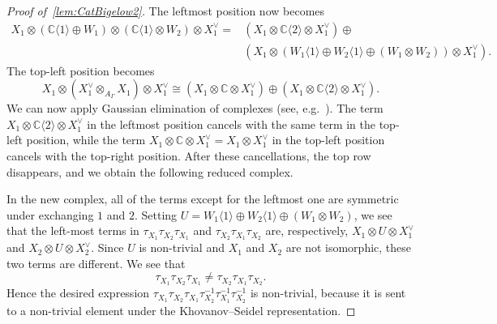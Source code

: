 \documentclass[a4paper]{amsart}
\newcommand{\C}{\mathbb{C}}
\newcommand{\0}{\mathbf{0}}
\theoremstyle{theorem}
\begin{document}
\begin{proof}[Proof of~\cref{lem:CatBigelow2}]
  The leftmost position now becomes
  \begin{align*}
    X_1 \otimes (\mathbb{C}\langle1 \rangle \oplus W_1) \otimes (\mathbb{C}\langle 1 \rangle \otimes W_2) \otimes X_1^{\vee} = &(X_1 \otimes \mathbb{C}\langle 2 \rangle \otimes X_1^{\vee}) \oplus \\
    &(X_1 \otimes (W_1\langle 1 \rangle \oplus W_2\langle 1 \rangle \oplus (W_1 \otimes W_2)) \otimes X_1^{\vee}).
  \end{align*}
  The top-left position becomes
  \[
    X_1\otimes (X_1^\vee \otimes_{A_{\Gamma}} X_1)\otimes X_1^\vee \cong (X_1 \otimes \mathbb{C} \otimes X_1^{\vee}) \oplus (X_1 \otimes \mathbb{C}\langle 2 \rangle \otimes X_1^{\vee}).
  \]
  We can now apply Gaussian elimination of complexes (see, e.g.~\cite[Lemma 4.2]{bar:07}).
  The term \(X_1 \otimes \mathbb{C}\langle 2 \rangle \otimes X_1^{\vee}\) in the leftmost position cancels with the same term in the top-left position, while the term \(X_1 \otimes \mathbb{C} \otimes X_1^{\vee} = X_1 \otimes X_1^{\vee}\) in the top-left position cancels with the top-right position.
  After these cancellations, the top row disappears, and we obtain the following reduced complex.
  \begin{center}
  \end{center}
In the new complex, all of the terms except for the leftmost one are symmetric under exchanging $1$ and $2$.
Setting \(U = W_1\langle 1 \rangle \oplus W_2 \langle 1 \rangle \oplus (W_1 \otimes W_2)\), we see that the left-most terms in $\tau_{X_1}\tau_{X_2}\tau_{X_1}$ and $\tau_{X_2} \tau_{X_1}\tau_{X_2}$ are, respectively, $X_1\otimes U \otimes X_1^\vee$ and \(X_2\otimes U \otimes X_2^\vee\).
Since $U$ is non-trivial and $X_1$ and $X_2$ are not isomorphic, these two terms are different.
We see that
\[\tau_{X_1}\tau_{X_2}\tau_{X_1} \neq \tau_{X_2} \tau_{X_1}\tau_{X_2}.\]
Hence the desired expression
\(\tau_{X_1}\tau_{X_2}\tau_{X_1}\tau_{X_2}^{-1}\tau_{X_1}^{-1}\tau_{X_2}^{-1}\)
is non-trivial, because it is sent to a non-trivial element under the Khovanov--Seidel representation.
\end{proof}
\end{document}
